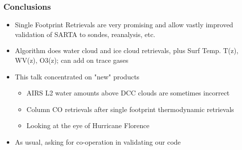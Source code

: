 \documentclass[10pt,t]{beamer}
\begin{document}
\begin{frame}
  \frametitle{Conclusions}
  \begin{itemize}
  \item Single Footprint Retrievals are very promising and allow vastly improved validation of SARTA to sondes, reanalysis, etc.
  \item Algorithm does water cloud and ice cloud retrievals, plus Surf Temp. T(z), WV(z), O3(z); can add on trace gases
  \item This talk concentrated on "new" products
    \begin{itemize}
    \item AIRS L2 water amounts above DCC clouds are sometimes incorrect
    \item Column CO retrievals after single footprint thermodynamic retrievals
    \item Looking at the eye of Hurricane Florence
    \end{itemize}
  \item As usual, asking for co-operation in validating our code
  \end{itemize}
\end{frame}
\end{document}
